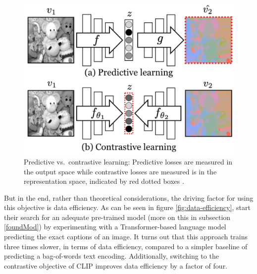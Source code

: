 \documentclass[
]{krantz}
\begin{document}
\begin{figure}

{\centering \includegraphics[width=1\linewidth]{figures/02-04-text-support-img/tian-predictive-vs-contrastive} 

}

\caption{Predictive vs.~contrastive learning: Predictive losses are measured in the output space while contrastive losses are measured is in the representation space, indicated by red dotted boxes \citep{tian2020contrastive}.}\label{fig:contr-vs-pred-learn}
\end{figure}



But in the end, rather than theoretical considerations, the driving factor for using this objective is data efficiency.
As can be seen in figure \ref{fig:data-efficiency}, \citet{radford2021learning} start their search for an adequate pre-trained model (more on this in subsection \ref{foundMod}) by experimenting with a Transformer-based language model predicting the exact captions of an image.
It turns out that this approach trains three times slower, in terms of data efficiency, compared to a simpler baseline of predicting a bag-of-words text encoding.
Additionally, switching to the contrastive objective of CLIP improves data efficiency by a factor of four.
\end{document}
